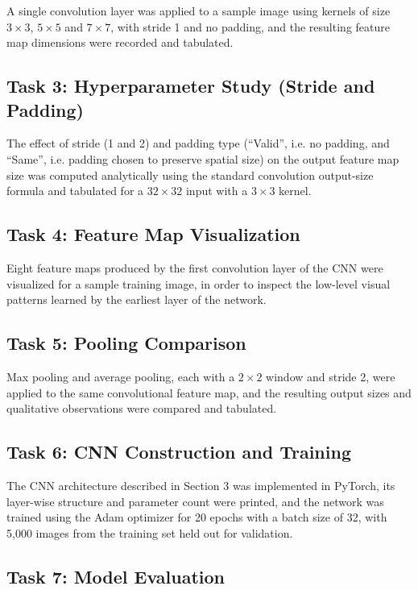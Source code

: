 \documentclass[11pt,a4paper]{article}
\begin{document}
A single convolution layer was applied to a sample image using kernels of size $3\times3$, $5\times5$ and $7\times7$, with stride 1 and no padding, and the resulting feature map dimensions were recorded and tabulated.

\subsection*{Task 3: Hyperparameter Study (Stride and Padding)}

The effect of stride (1 and 2) and padding type (``Valid'', i.e. no padding, and ``Same'', i.e. padding chosen to preserve spatial size) on the output feature map size was computed analytically using the standard convolution output-size formula and tabulated for a $32\times32$ input with a $3\times3$ kernel.

\subsection*{Task 4: Feature Map Visualization}

Eight feature maps produced by the first convolution layer of the CNN were visualized for a sample training image, in order to inspect the low-level visual patterns learned by the earliest layer of the network.

\subsection*{Task 5: Pooling Comparison}

Max pooling and average pooling, each with a $2\times2$ window and stride 2, were applied to the same convolutional feature map, and the resulting output sizes and qualitative observations were compared and tabulated.

\subsection*{Task 6: CNN Construction and Training}

The CNN architecture described in Section 3 was implemented in PyTorch, its layer-wise structure and parameter count were printed, and the network was trained using the Adam optimizer for 20 epochs with a batch size of 32, with 5{,}000 images from the training set held out for validation.

\subsection*{Task 7: Model Evaluation}
\end{document}
